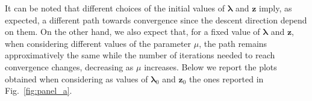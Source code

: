 \documentclass[a4paper,11pt]{article}
\begin{document}
\noindent It can be noted that different choices of the initial values of $\boldsymbol{\lambda}$ and $\textbf{z}$ imply, as expected, a different path towards convergence since the descent direction depend on them. On the other hand, we also expect that, for a fixed value of $\boldsymbol{\lambda}$ and $\textbf{z}$, when considering different values of the parameter $\mu$, the path remains approximatively the same while the number of iterations needed to reach convergence changes, decreasing as $\mu$ increases. Below we report the plots obtained when considering as values of $\boldsymbol{\lambda}_{0}$ and $\textbf{z}_{0}$ the ones reported in Fig.~\ref{fig:panel_a}.
\end{document}
